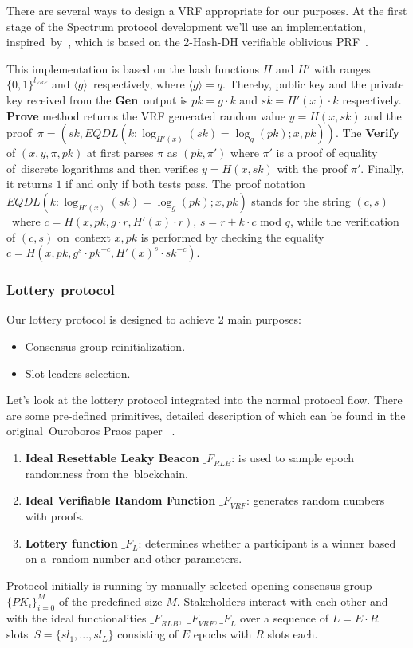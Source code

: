 There are several ways to design a VRF appropriate for our purposes.
At the first stage of the Spectrum protocol development we'll use an implementation, inspired\
by~\cite{cryptoeprint:2017/573}, which is based on the 2-Hash-DH verifiable oblivious PRF~\cite{asiacrypt:2014/233}.

This implementation is based on the hash functions $H$ and $H'$  with ranges $\{0,1\}^{l_{VRF}}$ and ${\langle g \rangle}$\
respectively, where ${\langle g \rangle = q}$.
Thereby, public key and the private key received from the \textbf{Gen}\
output is ${pk = g \cdot k}$ and ${sk = H'(x) \cdot k}$ respectively.
\textbf{Prove} method returns the VRF generated random value ${y = H(x, sk)}$ and the proof\
${\pi = (sk, EQDL(k : \log_{H'(x)}(sk) = \log_{g}(pk); x, pk))}$.
The \textbf{Verify} of ${(x, y, \pi, pk)}$ at first parses $\pi$ as ${(pk, \pi')}$ where $\pi'$ is a proof of equality of\
discrete logarithms and then verifies ${y = H(x, sk)}$ with the proof $\pi'$.
Finally, it returns $1$ if and only if both tests pass.
The proof notation ${EQDL(k : \log_{H'(x)}(sk) = \log_{g}(pk); x, pk)}$ stands for the string ${(c, s)}$\
where $c = H(x, pk, g \cdot r, H'(x) \cdot r)$, ${s = r + k \cdot c}$ mod $q$, while the verification of ${(c, s)}$ on\
context ${x, pk}$ is performed by checking the equality ${c = H(x, pk, g^s \cdot pk^{-c}, H'(x)^s \cdot sk^{-c})}$.

\subsubsection{Lottery protocol}
Our lottery protocol is designed to achieve 2 main purposes:
\begin{itemize}
    \item Consensus group reinitialization.
    \item Slot leaders selection.
\end{itemize}

Let's look at the lottery protocol integrated into the normal protocol flow.
There are some pre-defined primitives, detailed description of which can be found in the original\
Ouroboros Praos paper ~\cite{cryptoeprint:2017/573}.
\begin{enumerate}
    \item \textbf{Ideal Resettable Leaky Beacon} ${\mathcal_{F}}_{RLB}$: is used to sample epoch randomness from the\
    blockchain.
    \item \textbf{Ideal Verifiable Random Function} ${\mathcal_{F}}_{VRF}$: generates random numbers with proofs.
    \item \textbf{Lottery function} ${\mathcal_{F}}_{L}$: determines whether a participant is a winner based on a\
    random number and other parameters.
\end{enumerate}
Protocol initially is running by manually selected opening consensus group $\{PK_i\}_{i=0}^M$ of the predefined size $M$.
Stakeholders interact with each other and with the ideal functionalities ${\mathcal_{F}}_{RLB}$,\
${\mathcal_{F}}_{VRF}, {\mathcal_{F}}_{L}$ over a sequence of $L = E \cdot R$ slots\
${S=\{sl_1,...,sl_L\}}$ consisting of $E$ epochs with $R$ slots each.

